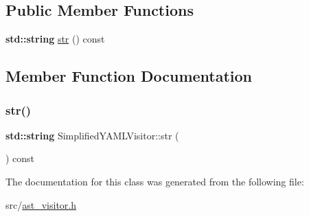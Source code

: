 \subsection*{Public Member Functions}
\begin{DoxyCompactItemize}
\item 
\textbf{ std\+::string} \hyperlink{class_simplified_y_a_m_l_visitor_ae2c9186d6624086d3ecb4aff757fe90e}{str} () const
\end{DoxyCompactItemize}


\subsection{Member Function Documentation}
\mbox{\label{class_simplified_y_a_m_l_visitor_ae2c9186d6624086d3ecb4aff757fe90e}} 
\subsubsection{\texorpdfstring{str()}{str()}}
{\footnotesize\ttfamily \textbf{ std\+::string} Simplified\+Y\+A\+M\+L\+Visitor\+::str (\begin{DoxyParamCaption}{ }\end{DoxyParamCaption}) const\hspace{0.3cm}{\ttfamily [inline]}}



The documentation for this class was generated from the following file\+:\begin{DoxyCompactItemize}
\item 
src/\hyperlink{ast__visitor_8h}{ast\+\_\+visitor.\+h}\end{DoxyCompactItemize}
